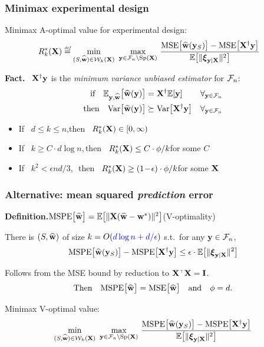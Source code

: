 \documentclass{beamer}
\begin{document}
\begin{frame}
  \frametitle{Minimax experimental design}
  \begin{definition}
    Minimax A-optimal value for experimental design:
\begin{align*}
R_k^*(\X)&\defeq 
  \min_{(S,\wbh)\in\Wc_k(\X)}\ \max_{\y\in\Fc_n\backslash\mathrm{Sp}(\X)}\,\frac{\mathrm{MSE}\big[\wbh(\y_S)\big]-
     \mathrm{MSE}\big[\X^\dagger\y\big]
  }{\E\big[\|\xib_{\y|\X}\|^2\big]}
\end{align*}
\end{definition}
\pause
\textbf{Fact.} \ $\mathbf X^\dagger\mathbf y$ is the \textit{minimum
  variance unbiased estimator} for $\mathcal{F}_n$:
\begin{align*}
  \text{if}\quad  \mathbb E_{\mathbf y,\widehat{\mathbf w}}\big[\widehat{\mathbf w}(\mathbf y)\big]
  &=\mathbf X^\dagger\mathbb E[\mathbf y]\quad\quad\,\forall_{\mathbf y\in\mathcal{F}_n}
\\ \text{then}\quad
  \mathrm{Var}\big[\widehat{\mathbf w}(\mathbf y)\big]&\succeq\mathrm{Var}\big[\mathbf X^\dagger\mathbf y\big]\quad \forall_{\mathbf y\in\mathcal{F}_n}
\end{align*}
\pause
\begin{itemize}
\item If \ $d\leq k\leq n$,\qquad\quad then \
  $R_k^*(\mathbf X)\in[0,\infty)$
    \pause
\item If \ $k\geq C\cdot d\log n$,\quad \,then \ $R_k^*(\mathbf X)\leq
  C\cdot\phi/k$\hfill for some $C$
\pause
\item If \ $k^2<\epsilon nd/3$,\qquad\ \,then \ $R_k^*(\mathbf X)\geq
    (1\!-\!\epsilon)\cdot\phi/k$\hfill for some $\mathbf X$
\end{itemize}
\end{frame}

\begin{frame}
  \frametitle{Alternative: mean squared \textit{prediction} error}
\textbf{Definition.}\quad    ${\mathrm{MSPE}\big[\widehat{\mathbf w}\big]} =
\mathbb E\big[\|\mathbf X(\widehat{\mathbf w}-\mathbf w^*)\|^2\big]$\quad (V-optimality)
\pause\vspace{5mm}
  \begin{theorem}
    There is $(S,\widehat{\mathbf w})$ of size $k=O(\color{blue}{d\log n +d/\epsilon}\color{black})$ s.t.~for
    any $\mathbf y\in\mathcal{F}_n$,
    \begin{align*}
\mathrm{MSPE}\big[\widehat{\mathbf w}(\mathbf y_S)\big] - \mathrm{MSPE}\big[\mathbf X^\dagger\mathbf y\big]
  \leq \epsilon\cdot 
  \mathbb E\big[\|\boldsymbol\xi_{\mathbf y|\mathbf X}\|^2\big]
\end{align*}
\end{theorem}
\pause\vspace{3mm}

Follows from the MSE bound by reduction to $\X^\top\X=\I$. 
\begin{align*}
\text{Then}\quad\mathrm{MSPE}\big[\widehat{\mathbf w}\big]=\mathrm{MSE}\big[\widehat{\mathbf w}\big]\quad\text{and}\quad\phi=d.
\end{align*}
\pause\vspace{2mm}

Minimax V-optimal value:
\begin{align*}
\min_{(S,\wbh)\in\Wc_k(\X)}\ \max_{\y\in\Fc_n\backslash\mathrm{Sp}(\X)}\,\frac{\mathrm{MSPE}\big[\wbh(\y_S)\big]-
     \mathrm{MSPE}\big[\X^\dagger\y\big]
  }{\E\big[\|\xib_{\y|\X}\|^2\big]}
\end{align*}
\end{frame}
\end{document}
